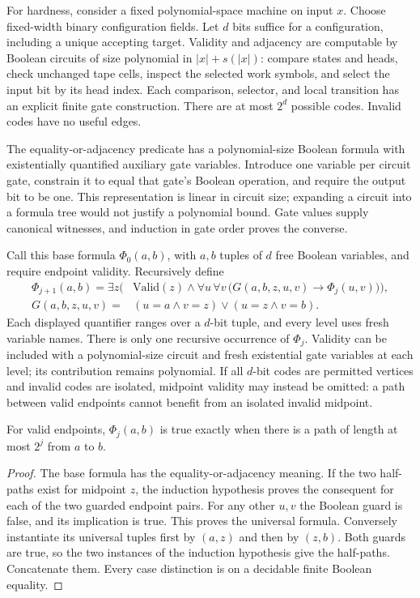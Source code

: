 For hardness, consider a fixed polynomial-space machine on input $x$.
Choose fixed-width binary configuration fields. Let $d$ bits suffice for a
configuration, including a unique accepting target. Validity and adjacency
are computable by Boolean circuits of size polynomial in $|x|+s(|x|)$:
compare states and heads, check unchanged tape cells, inspect the selected
work symbols, and select the input bit by its head index. Each comparison,
selector, and local transition has an explicit finite gate construction.
There are at most $2^d$ possible codes. Invalid codes have no useful edges.

The equality-or-adjacency predicate has a polynomial-size Boolean formula
with existentially quantified auxiliary gate variables. Introduce one
variable per circuit gate, constrain it to equal that gate's Boolean
operation, and require the output bit to be one. This representation is
linear in circuit size; expanding a circuit into a formula tree would not
justify a polynomial bound. Gate values supply canonical witnesses, and
induction in gate order proves the converse.

Call this base formula $\Phi_0(a,b)$, with $a,b$ tuples of $d$ free Boolean
variables, and require endpoint validity. Recursively define
\[
\begin{split}
 \Phi_{j+1}(a,b)=\exists z\bigl(&\mathrm{Valid}(z)\land
    \forall u\,\forall v\,\bigl(
       G(a,b,z,u,v)\to\Phi_j(u,v)\bigr)\bigr),\\
 G(a,b,z,u,v)={}&(u=a\land v=z)\lor(u=z\land v=b).
\end{split}
\]
Each displayed quantifier ranges over a $d$-bit tuple, and every level uses
fresh variable names. There is only one recursive occurrence of $\Phi_j$.
Validity can be included with a polynomial-size circuit and fresh
existential gate variables at each level; its contribution remains
polynomial. If all $d$-bit codes are permitted vertices and invalid codes
are isolated, midpoint validity may instead be omitted: a path between
valid endpoints cannot benefit from an isolated invalid midpoint.

\begin{lemma}
For valid endpoints, $\Phi_j(a,b)$ is true exactly when there is a path of
length at most $2^j$ from $a$ to $b$.
\end{lemma}
\begin{proof}
The base formula has the equality-or-adjacency meaning. If the two half-paths
exist for midpoint $z$, the induction hypothesis proves the consequent for
each of the two guarded endpoint pairs. For any other $u,v$ the Boolean
guard is false, and its implication is true. This proves the universal
formula. Conversely instantiate its universal tuples first by $(a,z)$ and
then by $(z,b)$. Both guards are true, so the two instances of the induction
hypothesis give the half-paths. Concatenate them. Every case distinction
is on a decidable finite Boolean equality.
\end{proof}

